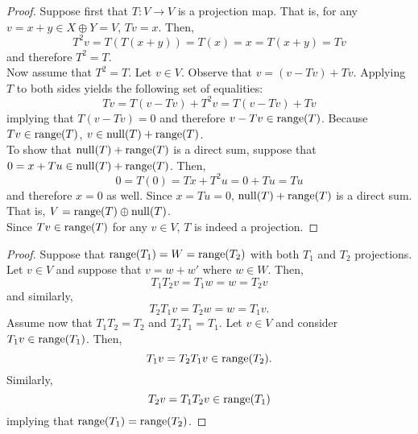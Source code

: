 \documentclass[../../AlgebraQualSolutions.tex]{subfiles}
\begin{document}
	\begin{proof}
		Suppose first that $T: V \to V$ is a projection map. That is, for any $v = x + y \in X \oplus Y = V$, $Tv = x$. Then,
			\[T^2v = T(T(x+y)) = T(x) = x = T(x+y) = Tv\]
		and therefore $T^2 = T$.\\

		Now assume that $T^2=T$. Let $v  \in V$. Observe that $v = (v - Tv) + Tv$. Applying $T$ to both sides yields the following set of equalities:
			\[Tv = T(v-Tv) + T^2v = T(v-Tv) + Tv\]
		implying that $T(v-Tv) =0$ and therefore $v-Tv \in \mathrm{range}(T)$. Because $Tv \in \mathrm{range}(T)$, $v \in \mathrm{null}(T) + \mathrm{range}(T)$.\\
		
		To show that $\mathrm{null}(T) + \mathrm{range}(T)$ is a direct sum, suppose that $0 = x + Tu \in \mathrm{null}(T) + \mathrm{range}(T)$. Then,	
			\[0 = T(0) = Tx + T^2u = 0 + Tu = Tu \]
		and therefore $x = 0$ as well. Since $x = Tu = 0$, $\mathrm{null}(T) + \mathrm{range}(T)$ is a direct sum. That is, $V = \mathrm{range}(T) \oplus \mathrm{null}(T)$.\\

		Since $Tv \in \mathrm{range}(T)$ for any $v \in V$, $T$ is indeed a projection.
	\end{proof}

	\begin{proof}
		Suppose that $\mathrm{range}(T_1) = W = \mathrm{range}(T_2)$ with both $T_1$ and $T_2$ projections. Let $v \in V$ and suppose that $v = w + w'$ where $w \in W$. Then,
			\[T_1T_2v = T_1w = w = T_2v\]
		and similarly,
			\[T_2T_1v = T_2w = w = T_1v.\]
		Assume now that $T_1T_2 = T_2$ and $T_2T_1 = T_1$. Let $v \in V$ and consider $T_1v \in \mathrm{range}(T_1)$. Then,
			\[T_1v = T_2T_1v \in \mathrm{range}(T_2).\]
		Similarly,
			\[T_2v = T_1T_2v \in \mathrm{range}(T_1) \]
		implying that $\mathrm{range}(T_1) = \mathrm{range}(T_2)$.
	\end{proof}
\end{document}
